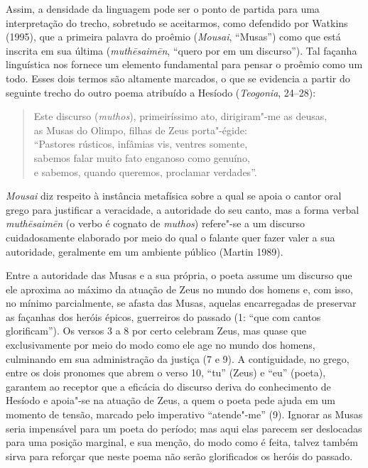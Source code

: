 Assim, a densidade da linguagem pode ser o ponto de partida para uma
interpretação do trecho, sobretudo se aceitarmos, como defendido por
Watkins (1995), que a primeira palavra do proêmio (\emph{Mousai},
``Musas'') como que está inscrita em sua última
(\emph{\emph{muthēsaimēn}}, ``quero por em um discurso''). Tal façanha
linguística nos fornece um elemento fundamental para pensar o proêmio
como um todo. Esses dois termos são altamente marcados, o que se
evidencia a partir do seguinte trecho do outro poema atribuído a Hesíodo
(\emph{Teogonia}, 24--28):

\begin{verse}
Este discurso (\emph{muthos}), primeiríssimo ato, dirigiram"-me as deusas,\\
as Musas do Olimpo, filhas de Zeus porta"-égide:\\
``Pastores rústicos, infâmias vis, ventres somente,\\
sabemos falar muito fato enganoso como genuíno,\\
e sabemos, quando queremos, proclamar verdades''.
\end{verse}

\emph{Mousai} diz respeito à instância metafísica sobre a qual se apoia
o cantor oral grego para justificar a veracidade, a autoridade do seu
canto, mas a forma verbal \emph{muthēsaimēn} (o verbo é cognato de
\emph{muthos}) refere"-se a um discurso cuidadosamente elaborado por meio
do qual o falante quer fazer valer a sua autoridade, geralmente em um
ambiente público (Martin 1989).

Entre a autoridade das Musas e a sua própria, o poeta assume um discurso
que ele aproxima ao máximo da atuação de Zeus no mundo dos homens e, com
isso, no mínimo parcialmente, se afasta das Musas, aquelas encarregadas
de preservar as façanhas dos heróis épicos, guerreiros do passado (1:
``que com cantos glorificam''). Os versos 3 a 8 por certo celebram Zeus,
mas quase que exclusivamente por meio do modo como ele age no mundo dos
homens, culminando em sua administração da justiça (7 e 9). A
contiguidade, no grego, entre os dois pronomes que abrem o verso 10,
``tu'' (Zeus) e ``eu'' (poeta), garantem ao receptor que a eficácia do
discurso deriva do conhecimento de Hesíodo e apoia"-se na atuação de
Zeus, a quem o poeta pede ajuda em um momento de tensão, marcado pelo
imperativo ``atende"-me'' (9). Ignorar as Musas seria impensável para um
poeta do período; mas aqui elas parecem ser deslocadas para uma posição
marginal, e sua menção, do modo como é feita, talvez também sirva para
reforçar que neste poema não serão glorificados os heróis do passado.


